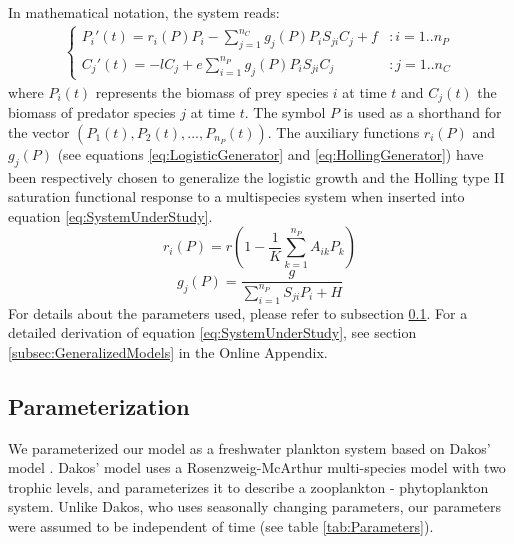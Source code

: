 In mathematical notation, the system reads:
%
\begin{eqnarray}
\label{eq:SystemUnderStudy}
	\begin{cases}
	P_i'(t) =  r_i(P) P_i  - \sum_{j = 1}^{n_C} g_j(P) P_i S_{ji} C_j + f & : i = 1..n_P
	\\
	C_j'(t) = - l C_j +  e \sum_{i = 1}^{n_P} g_j(P) P_i S_{ji} C_j  & : j = 1..n_C
	\end{cases}
\end{eqnarray}
%
where $P_i(t)$ represents the biomass of prey species $i$ at time $t$ and $C_j(t)$ the biomass of predator species $j$ at time $t$. The symbol $P$ is used as a shorthand for the vector $(P_1(t), P_2(t), ..., P_{n_P}(t))$. The auxiliary functions $r_i(P)$ and $g_j(P)$ (see equations \eqref{eq:LogisticGenerator} and \eqref{eq:HollingGenerator}) have been respectively chosen to generalize the logistic growth and the Holling type II saturation functional response \citep{Edelstein-Keshet} to a multispecies system when inserted into equation \eqref{eq:SystemUnderStudy}.
%
\begin{equation}
\label{eq:LogisticGenerator}
	r_i(P) = r \left( 1 - \frac{1}{K} \sum_{k=1}^{n_P} A_{ik} P_k \right)
\end{equation}
%
\begin{equation}
\label{eq:HollingGenerator}
	g_j(P) = \frac{g}{\sum_{i=1}^{n_P} S_{ji} P_i + H}
\end{equation}
%
For details about the parameters used, please refer to subsection \ref{subsec:Parameterization}. For a detailed derivation of equation \eqref{eq:SystemUnderStudy}, see section \ref{subsec:GeneralizedModels} in the Online Appendix.

\subsection{Parameterization}
\label{subsec:Parameterization}
We parameterized our model as a freshwater plankton system based on Dakos' model \citep{Dakos2009b}. Dakos' model uses a Rosenzweig-McArthur multi-species model with two trophic levels, and parameterizes it to describe a zooplankton - phytoplankton system. Unlike Dakos, who uses seasonally changing parameters, our parameters were assumed to be independent of time (see table \ref{tab:Parameters}).

